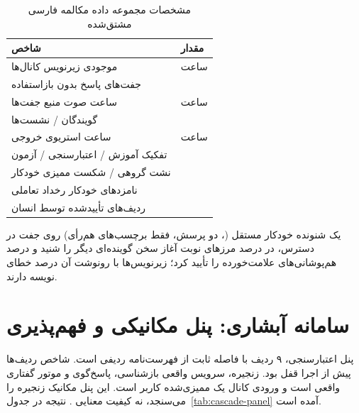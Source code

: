 \begin{table}[ht]
\centering
\caption{مشخصات مجموعه داده مکالمه فارسی مشتق‌شده}
\label{tab:corpus}
\small
\begin{tabular}{L{7.6cm}R{3.2cm}}
\toprule
\textbf{شاخص} & \textbf{مقدار} \\
\midrule
موجودی زیرنویس کانال‌ها &  ساعت \\
جفت‌های پاسخ بدون بازاستفاده &  \\
ساعت صوت منبع جفت‌ها &  ساعت \\
گویندگان / نشست‌ها &  \\
ساعت استریوی خروجی &  ساعت \\
تفکیک آموزش / اعتبارسنجی / آزمون &  \\
نشت گروهی / شکست ممیزی خودکار &  \\
نامزدهای خودکار رخداد تعاملی &  \\
ردیف‌های تأییدشده توسط انسان &  \\
\bottomrule
\end{tabular}
\end{table}

یک شنونده خودکار مستقل (، دو پرسش، فقط برچسب‌های هم‌رأی) روی 
جفت در دسترس، در  درصد مرزهای نوبت آغاز سخن گوینده‌ای دیگر را شنید و
 درصد هم‌پوشانی‌های علامت‌خورده را تأیید کرد؛ زیرنویس‌ها با رونوشت آن
 درصد خطای نویسه دارند.


\section{سامانه آبشاری: پنل مکانیکی و فهم‌پذیری}
\label{sec:res-cascade}

پنل اعتبارسنجی، ۹ ردیف با فاصله ثابت از فهرست‌نامه  ردیفی است. شاخص
ردیف‌ها پیش از اجرا قفل بود. زنجیره، سرویس واقعی بازشناسی، پاسخ‌گوی
 و موتور گفتاری واقعی است و ورودی کانال یک
ممیزی‌شده کاربر است. این پنل مکانیک زنجیره را می‌سنجد، نه کیفیت معنایی
. نتیجه در جدول~\ref{tab:cascade-panel} آمده است.

